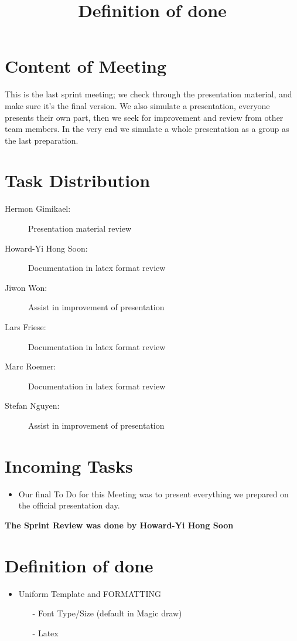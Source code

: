 \documentclass{article}
\begin{document}
\section*{Content of Meeting}
This is the last sprint meeting; we check through the presentation material, and make sure it’s 
the final version. We also simulate a presentation, everyone presents their own part, 
then we seek for improvement and review from other team members. In the very end we simulate a whole presentation as a group as the last preparation. 
\section*{Task Distribution}
\begin{description}
    \item[Hermon Gimikael:] Presentation material review 
    \item[Howard-Yi Hong Soon:] Documentation in latex format review
    \item[Jiwon Won:] Assist in improvement of presentation
    \item[Lars Friese:] Documentation in latex format review
    \item[Marc Roemer:] Documentation in latex format review
    \item[Stefan Nguyen:] Assist in improvement of presentation
\end{description}

\section*{Incoming Tasks}
\begin{itemize}
	\item Our final To Do for this Meeting was to present everything we prepared on the official presentation day.
\end{itemize}
\noindent
\textbf{The Sprint Review was done by Howard-Yi Hong Soon}
\newpage

\section{Definition of done}
\title{Definition of done}
\begin{itemize}
\item
  Uniform Template and FORMATTING
  \begin{itemize} 
	\item[-]Font Type/Size (default in Magic draw)
	\item[-]Latex
	\end{itemize}
\end{itemize}
\end{document}
